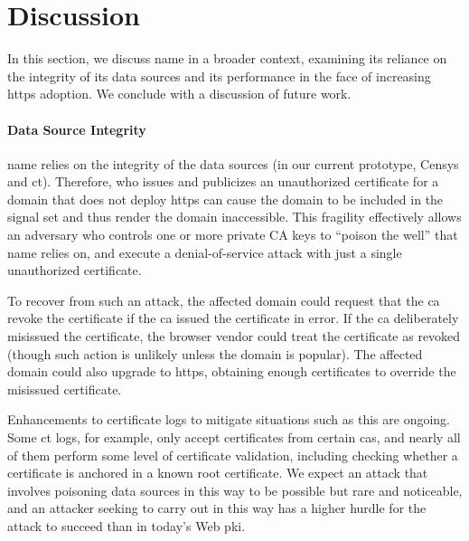 \section{Discussion}
\label{sec:discussion}

In this section, we discuss \ac{name} in a broader context, examining its
reliance on the integrity of its data sources and its performance in
the face of increasing \ac{https} adoption. We conclude with a discussion of
future work.

\paragraph{Data Source Integrity}

\ac{name} relies on the integrity of the data sources (in our current prototype,
Censys and \ac{ct}). Therefore,  who issues
and publicizes an unauthorized certificate for a domain that does not deploy
\ac{https} can cause the domain to be included in the signal set and thus render
the domain inaccessible. This fragility effectively allows an adversary who controls
one or more private CA keys to
``poison the well'' that \ac{name} relies on, and execute a denial-of-service
attack with just a single unauthorized certificate.

To recover from such an attack, the
affected domain could request that the \ac{ca} revoke the certificate if the
\ac{ca} issued the certificate in error. If the \ac{ca} deliberately misissued
the certificate, the browser vendor could treat the certificate as revoked
(though such action is unlikely unless the domain is popular). The affected
domain could also upgrade to \ac{https}, obtaining enough certificates to
override the misissued certificate. 

Enhancements to certificate logs to mitigate situations such as this are ongoing. Some
\ac{ct} logs, for example, only accept certificates from certain \acp{ca}, and
nearly all of them perform some level of certificate validation, including
checking whether a certificate is anchored in a known root certificate. We
expect an attack that involves poisoning data sources in this way to be possible
but rare and noticeable, and an attacker seeking to carry out  in this way has a
higher hurdle for the attack to succeed than in today's Web \ac{pki}.

